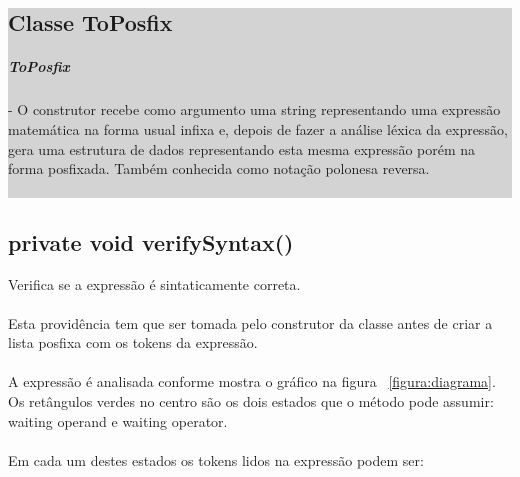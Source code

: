\documentclass[a4paper,12pt,openany]{book}
\begin{document}
\colorbox{lightgrey}{
	
	\begin{minipage}{18cm}
		
		\chapter*{Classe ToPosfix}
		
		\paragraph{ToPosfix} - O construtor recebe como argumento uma string representando uma expressão matemática na forma usual infixa e, depois de fazer a análise léxica da expressão, gera uma estrutura de dados representando esta mesma expressão porém na forma posfixada. Também conhecida como notação polonesa reversa.
		\\
		\\
	
		
	\end{minipage}
	
}%

\newpage


\section*{private void verifySyntax()}

Verifica se a expressão é sintaticamente correta.
\\
\\
Esta providência tem que ser tomada pelo construtor da classe antes de criar a lista posfixa com os tokens da expressão.
\\
\\
A expressão é analisada conforme mostra o gráfico na figura ~\ref{figura:diagrama}. Os retângulos verdes no centro são os dois estados que o método pode assumir: waiting operand e waiting operator.
\\
\\
Em cada um destes estados os tokens lidos na expressão podem ser:
\end{document}
